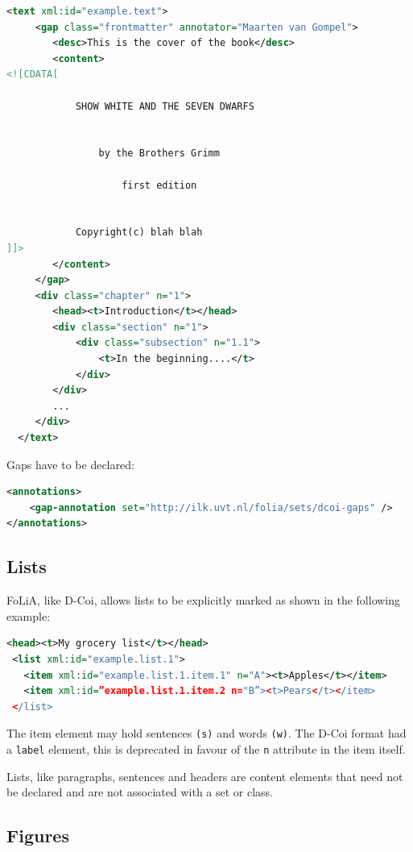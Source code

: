 \documentclass[a4paper,12pt]{report}
\begin{document}
\begin{lstlisting}[language=xml]
  <text xml:id="example.text">
     <gap class="frontmatter" annotator="Maarten van Gompel">
        <desc>This is the cover of the book</desc>
        <content>
<![CDATA[        
    
            SHOW WHITE AND THE SEVEN DWARFS
            
            
                by the Brothers Grimm
                
                    first edition
                     
            
            Copyright(c) blah blah
]]>
        </content>
     </gap>
     <div class="chapter" n="1">
        <head><t>Introduction</t></head>
        <div class="section" n="1">
            <div class="subsection" n="1.1">
                <t>In the beginning....</t>
            </div>
        </div>
        ...
     </div>
  </text>
\end{lstlisting}

Gaps have to be declared:

\begin{lstlisting}[language=xml]
<annotations>
    <gap-annotation set="http://ilk.uvt.nl/folia/sets/dcoi-gaps" />
</annotations>
\end{lstlisting}

\subsection{Lists}

FoLiA, like D-Coi, allows lists to be explicitly marked as shown in the following example:

\begin{lstlisting}[language=xml]
 <head><t>My grocery list</t></head>
 <list xml:id="example.list.1">
   <item xml:id="example.list.1.item.1" n="A"><t>Apples</t></item>
   <item xml:id=”example.list.1.item.2 n="B”><t>Pears</t></item>
 </list>
\end{lstlisting}

The item element may hold sentences \texttt{(s)} and words \texttt{(w)}. The D-Coi format had a \texttt{label} element, this is deprecated in favour of the \texttt{n} attribute in the item itself.

Lists, like paragraphs, sentences and headers are content elements that need not be declared and are not associated with a set or class.

\subsection{Figures}
\end{document}
